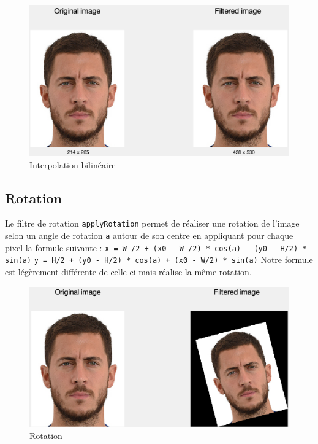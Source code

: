 \documentclass[12pt,a4paper]{article}
\begin{document}
\begin{figure}[H]
\centering
\includegraphics[scale=0.5]{img/interpolation}
\caption{Interpolation bilinéaire}
\end{figure}

\subsection{Rotation}
Le filtre de rotation \texttt{applyRotation} permet de réaliser une rotation de l'image selon un angle de rotation \texttt{a} autour de son centre en appliquant pour chaque pixel la formule suivante :
\newline
\texttt{x = W /2 + (x0 - W /2) * cos(a) - (y0 - H/2) * sin(a)}
\newline
\texttt{y = H/2 + (y0 - H/2) * cos(a) + (x0 - W/2) * sin(a)}
\newline
Notre formule est légèrement différente de celle-ci mais réalise la même rotation.

\begin{figure}[H]
\centering
\includegraphics[scale=0.5]{img/rotate}
\caption{Rotation}
\end{figure}
\end{document}
